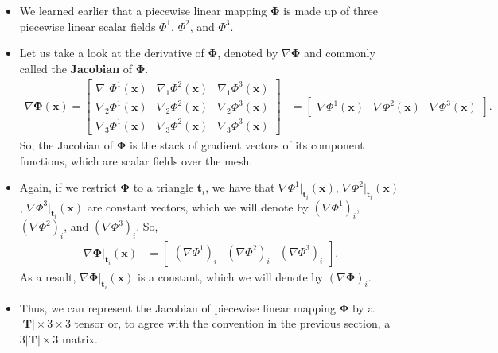 \documentclass[10pt]{article}
\newcommand{\ve}[1]{\mathbf{#1}}
\newcommand{\ves}[1]{\boldsymbol{#1}}
\begin{document}
\begin{itemize}        
    \item We learned earlier that a piecewise linear mapping $\ves{\Phi}$ is made up of three piecewise linear scalar fields $\Phi^1$, $\Phi^2$, and $\Phi^3$.
    
    \item Let us take a look at the derivative of $\ves{\Phi}$, denoted by $\nabla \ves{\Phi}$ and commonly called the {\bf Jacobian} of $\ves{\Phi}$.
    \begin{align*}
        \nabla \ves{\Phi}(\ve{x}) = \begin{bmatrix}
            \nabla_1 \Phi^1(\ve{x}) & \nabla_1 \Phi^2(\ve{x}) & \nabla_1 \Phi^3(\ve{x}) \\
            \nabla_2 \Phi^1(\ve{x}) & \nabla_2 \Phi^2(\ve{x}) & \nabla_2 \Phi^3(\ve{x}) \\
            \nabla_3 \Phi^1(\ve{x}) & \nabla_3 \Phi^2(\ve{x}) & \nabla_3 \Phi^3(\ve{x})
        \end{bmatrix}
        &= \begin{bmatrix}
            \nabla \Phi^1(\ve{x}) & \nabla \Phi^2(\ve{x}) & \nabla \Phi^3(\ve{x})
        \end{bmatrix}.
    \end{align*}
    So, the Jacobian of $\ves{\Phi}$ is the stack of gradient vectors of its component functions, which are scalar fields over the mesh.

    \item Again, if we restrict $\ves{\Phi}$ to a triangle $\ve{t}_i$, we have that $\nabla \Phi^1|_{\ve{t}_i}(\ve{x})$, $\nabla \Phi^2|_{\ve{t}_i}(\ve{x})$, $\nabla \Phi^3|_{\ve{t}_i}(\ve{x})$ are constant vectors, which we will denote by $(\nabla\Phi^1)_i$, $(\nabla\Phi^2)_i$, and $(\nabla\Phi^3)_i$. So,
    \begin{align*}
        \nabla \ves{\Phi}|_{\ve{t}_i}(\ve{x})
        &= \begin{bmatrix}
            (\nabla \Phi^1)_i & (\nabla \Phi^2)_i & (\nabla \Phi^3)_i
        \end{bmatrix}.
    \end{align*}
    As a result, $\nabla \ves{\Phi}|_{\ve{t}_i}(\ve{x})$ is a constant, which we will denote by $(\nabla \ves{\Phi})_i$. 

    \item Thus, we can represent the Jacobian of piecewise linear mapping $\ves{\Phi}$ by a $|\ve{T}| \times 3 \times 3$ tensor or, to agree with the convention in the previous section, a $3|\ve{T}| \times 3$ matrix.
    

\end{itemize}
\end{document}
